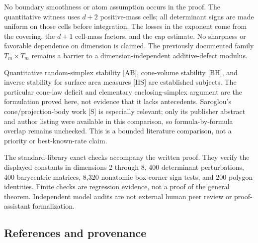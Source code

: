 \documentclass[
  11pt,
]{article}
\begin{document}
No boundary smoothness or atom assumption occurs in the proof. The
quantitative witness uses \(d+2\) positive-mass cells; all determinant
signs are made uniform on those cells before integration. The losses in
the exponent come from the covering, the \(d+1\) cell-mass factors, and
the cap estimate. No sharpness or favorable dependence on dimension is
claimed. The previously documented family \(T_m\times T_m\) remains a
barrier to a dimension-independent additive-defect modulus.

Quantitative random-simplex stability {[}AB{]}, cone-volume stability
{[}BH{]}, and inverse stability for surface area measures {[}HS{]} are
established subjects. The particular cone-law deficit and elementary
enclosing-simplex argument are the formulation proved here, not evidence
that it lacks antecedents. Saroglou's cone/projection-body work {[}S{]}
is especially relevant; only its publisher abstract and author listing
were available in this comparison, so formula-by-formula overlap remains
unchecked. This is a bounded literature comparison, not a priority or
best-known-rate claim.

The standard-library exact checks accompany the written proof. They
verify the displayed constants in dimensions 2 through 8, 400
determinant perturbations, 400 barycentric matrices, 8,320 nonatomic
box-corner sign tests, and 200 polygon identities. Finite checks are
regression evidence, not a proof of the general theorem. Independent
model audits are not external human peer review or proof-assistant
formalization.

\clearpage

\subsection{References and provenance}\label{references-and-provenance}
\end{document}

